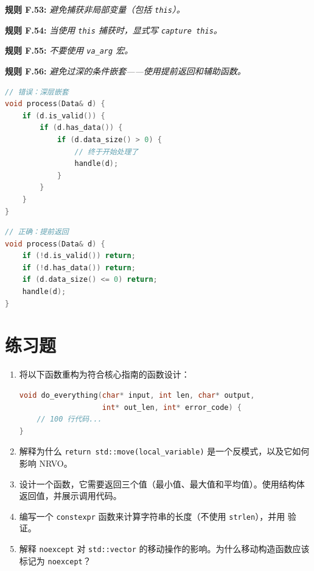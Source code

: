 \textbf{规则 F.53:} \textit{避免捕获非局部变量（包括 \texttt{this}）。}

\textbf{规则 F.54:} \textit{当使用 \texttt{this} 捕获时，显式写 \texttt{capture this}。}

\textbf{规则 F.55:} \textit{不要使用 \texttt{va\_arg} 宏。}

\textbf{规则 F.56:} \textit{避免过深的条件嵌套——使用提前返回和辅助函数。}

\begin{lstlisting}[language=C++]
// 错误：深层嵌套
void process(Data& d) {
    if (d.is_valid()) {
        if (d.has_data()) {
            if (d.data_size() > 0) {
                // 终于开始处理了
                handle(d);
            }
        }
    }
}
\end{lstlisting}

\begin{lstlisting}[language=C++]
// 正确：提前返回
void process(Data& d) {
    if (!d.is_valid()) return;
    if (!d.has_data()) return;
    if (d.data_size() <= 0) return;
    handle(d);
}
\end{lstlisting}

\section*{练习题}

\begin{enumerate}
  \item 将以下函数重构为符合核心指南的函数设计：
\begin{lstlisting}[language=C++]
void do_everything(char* input, int len, char* output,
                   int* out_len, int* error_code) {
    // 100 行代码...
}
\end{lstlisting}
  \item 解释为什么 \texttt{return std::move(local\_variable)} 是一个反模式，以及它如何影响 NRVO。
  \item 设计一个函数，它需要返回三个值（最小值、最大值和平均值）。使用结构体返回值，并展示调用代码。
  \item 编写一个 \texttt{constexpr} 函数来计算字符串的长度（不使用 \texttt{strlen}），并用 \texttt{} 验证。
  \item 解释 \texttt{noexcept} 对 \texttt{std::vector} 的移动操作的影响。为什么移动构造函数应该标记为 \texttt{noexcept}？
\end{enumerate}



